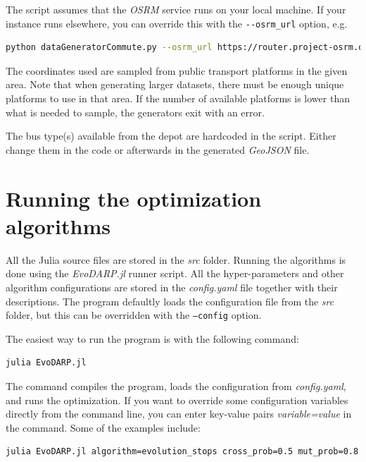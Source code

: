 The script assumes that the \textit{OSRM} service runs on your local machine. If your instance runs elsewhere, you can override this with the \texttt{-{}-osrm\_url} option, e.g.

\begin{lstlisting}[language=bash, breaklines=true]
    python dataGeneratorCommute.py --osrm_url https://router.project-osrm.org
\end{lstlisting}

The coordinates used are sampled from public transport platforms in the given area. Note that when generating larger datasets, there must be enough unique platforms to use in that area. If the number of available platforms is lower than what is needed to sample, the generators exit with an error.

The bus type(s) available from the depot are hardcoded in the script. Either change them in the code or afterwards in the generated \textit{GeoJSON} file.

\section{Running the optimization algorithms}

All the Julia source files are stored in the \textit{src} folder. Running the algorithms is done using the \textit{EvoDARP.jl} runner script. All the hyper-parameters and other algorithm configurations are stored in the \textit{config.yaml} file together with their descriptions. The program defaultly loads the configuration file from the \textit{src} folder, but this can be overridden with the \texttt{--config} option.

The easiest way to run the program is with the following command:
\begin{lstlisting}[language=bash]
    julia EvoDARP.jl
\end{lstlisting}

The command compiles the program, loads the configuration from \textit{config.yaml}, and runs the optimization. If you want to override some configuration variables directly from the command line, you can enter key-value pairs \textit{variable=value} in the command. Some of the examples include:

\begin{lstlisting}[language=bash, breaklines=true]
    julia EvoDARP.jl algorithm=evolution_stops cross_prob=0.5 mut_prob=0.8 num_generations=20000
\end{lstlisting}

